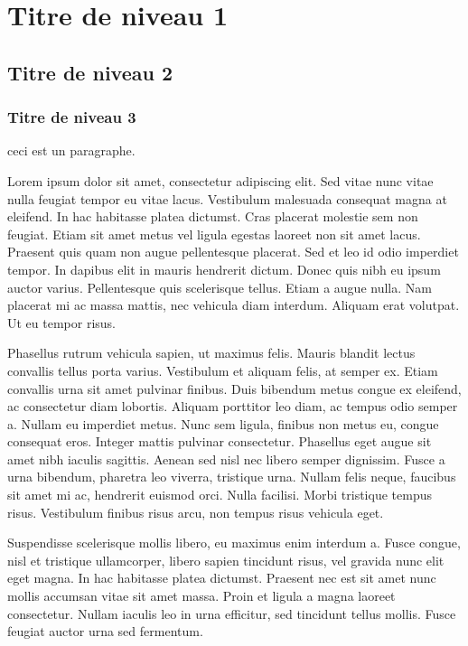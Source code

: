 \documentclass[
  10pt,
]{book}
\begin{document}
\hypertarget{titre-de-niveau-1}{%
\section{Titre de niveau 1}\label{titre-de-niveau-1}}

\hypertarget{titre-de-niveau-2}{%
\subsection{Titre de niveau 2}\label{titre-de-niveau-2}}

\hypertarget{titre-de-niveau-3}{%
\subsubsection{Titre de niveau 3}\label{titre-de-niveau-3}}

ceci est un paragraphe.

Lorem ipsum dolor sit amet, consectetur adipiscing elit. Sed vitae nunc
vitae nulla feugiat tempor eu vitae lacus. Vestibulum malesuada
consequat magna at eleifend. In hac habitasse platea dictumst. Cras
placerat molestie sem non feugiat. Etiam sit amet metus vel ligula
egestas laoreet non sit amet lacus. Praesent quis quam non augue
pellentesque placerat. Sed et leo id odio imperdiet tempor. In dapibus
elit in mauris hendrerit dictum. Donec quis nibh eu ipsum auctor varius.
Pellentesque quis scelerisque tellus. Etiam a augue nulla. Nam placerat
mi ac massa mattis, nec vehicula diam interdum. Aliquam erat volutpat.
Ut eu tempor risus.

Phasellus rutrum vehicula sapien, ut maximus felis. Mauris blandit
lectus convallis tellus porta varius. Vestibulum et aliquam felis, at
semper ex. Etiam convallis urna sit amet pulvinar finibus. Duis bibendum
metus congue ex eleifend, ac consectetur diam lobortis. Aliquam
porttitor leo diam, ac tempus odio semper a. Nullam eu imperdiet metus.
Nunc sem ligula, finibus non metus eu, congue consequat eros. Integer
mattis pulvinar consectetur. Phasellus eget augue sit amet nibh iaculis
sagittis. Aenean sed nisl nec libero semper dignissim. Fusce a urna
bibendum, pharetra leo viverra, tristique urna. Nullam felis neque,
faucibus sit amet mi ac, hendrerit euismod orci. Nulla facilisi. Morbi
tristique tempus risus. Vestibulum finibus risus arcu, non tempus risus
vehicula eget.

Suspendisse scelerisque mollis libero, eu maximus enim interdum a. Fusce
congue, nisl et tristique ullamcorper, libero sapien tincidunt risus,
vel gravida nunc elit eget magna. In hac habitasse platea dictumst.
Praesent nec est sit amet nunc mollis accumsan vitae sit amet massa.
Proin et ligula a magna laoreet consectetur. Nullam iaculis leo in urna
efficitur, sed tincidunt tellus mollis. Fusce feugiat auctor urna sed
fermentum.
\end{document}
